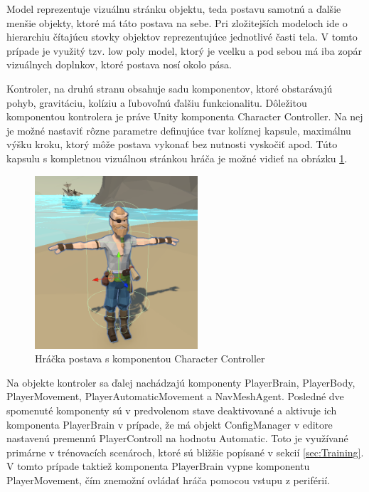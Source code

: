 \documentclass[slovak, master]{diploma}
\begin{document}
Model reprezentuje vizuálnu stránku objektu, teda postavu samotnú a ďalšie menšie objekty, ktoré má táto postava na sebe. Pri zložitejších modeloch ide o hierarchiu čítajúcu stovky objektov reprezentujúce jednotlivé časti tela. V tomto prípade je využitý tzv. low poly model, ktorý je vcelku a pod sebou má iba zopár vizuálnych doplnkov, ktoré postava nosí okolo pása.

Kontroler, na druhú stranu obsahuje sadu komponentov, ktoré obstarávajú pohyb, gravitáciu, kolíziu a ľubovoľnú ďalšiu funkcionalitu. Dôležitou komponentou kontrolera je práve Unity komponenta Character Controller. Na nej je možné nastaviť rôzne parametre definujúce tvar kolíznej kapsule, maximálnu výšku kroku, ktorý môže postava vykonať bez nutnosti vyskočiť apod. Túto kapsulu s kompletnou vizuálnou stránkou hráča je možné vidieť na obrázku \ref{pic:PlayerController}.

\begin{figure}[!htbp]
	\centering
	\includegraphics[width=0.54\textwidth]{Figures/controller.png}
	\caption{Hráčka postava s komponentou Character Controller}
	\label{pic:PlayerController}
\end{figure}

Na objekte kontroler sa ďalej nachádzajú komponenty PlayerBrain, PlayerBody, PlayerMovement, PlayerAutomaticMovement a NavMeshAgent. Posledné dve spomenuté komponenty sú v predvolenom stave deaktivované a aktivuje ich komponenta PlayerBrain v prípade, že má objekt ConfigManager v editore nastavenú premennú PlayerControll na hodnotu Automatic. Toto je využívané primárne v trénovacích scenároch, ktoré sú bližšie popísané v sekcií \ref{sec:Training}. V tomto prípade taktiež komponenta PlayerBrain vypne komponentu PlayerMovement, čím znemožní ovládať hráča pomocou vstupu z periférií. 
\end{document}
